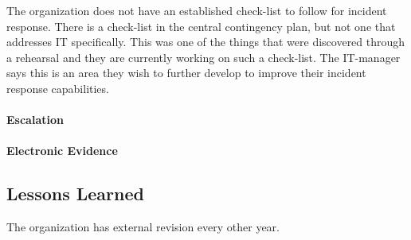 The organization does not have an established check-list to follow for incident response. There is a check-list in the central contingency plan, but not one that addresses IT specifically. This was one of the things that were discovered through a rehearsal and they are currently working on such a check-list. The IT-manager says this is an area they wish to further develop to improve their incident response capabilities. 

\paragraph{Escalation}
\paragraph{Electronic Evidence}

\subsection{Lessons Learned}
The organization has external revision every other year.
